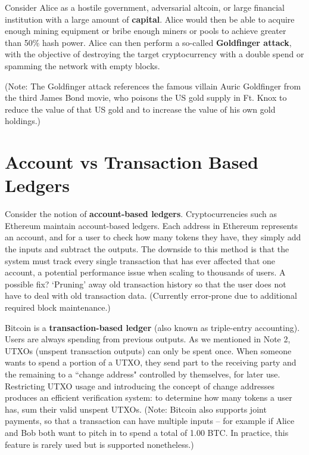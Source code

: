 \documentclass[full.tex]{subfiles}
\begin{document}
    Consider Alice as a hostile government, adversarial altcoin, or large financial institution with a large amount of \textbf{capital}. Alice would then be able to acquire enough mining equipment or bribe enough miners or pools to achieve greater than 50\% hash power. Alice can then perform a so-called \textbf{Goldfinger attack}, with the objective of destroying the target cryptocurrency with a double spend or spamming the network with empty blocks.
    
    (Note: The Goldfinger attack references the famous villain Auric Goldfinger from the third James Bond movie, who poisons the US gold supply in Ft. Knox to reduce the value of that US gold and to increase the value of his own gold holdings.)
    
    \section*{Account vs Transaction Based Ledgers}
    
    Consider the notion of \textbf{account-based ledgers}. Cryptocurrencies such as Ethereum maintain account-based ledgers. Each address in Ethereum represents an account, and for a user to check how many tokens they have, they simply add the inputs and subtract the outputs. The downside to this method is that the system must track every single transaction that has ever affected that one account, a potential performance issue when scaling to thousands of users. A possible fix? `Pruning' away old transaction history so that the user does not have to deal with old transaction data. (Currently error-prone due to additional required block maintenance.)
    
    Bitcoin is a \textbf{transaction-based ledger} (also known as triple-entry accounting). Users are always spending from previous outputs. As we mentioned in Note 2, UTXOs (unspent transaction outputs) can only be spent once. When someone wants to spend a portion of a UTXO, they send part to the receiving party and the remaining to a ``change address" controlled by themselves, for later use. Restricting UTXO usage and introducing the concept of change addresses produces an efficient verification system: to determine how many tokens a user has, sum their valid unspent UTXOs. (Note: Bitcoin also supports joint payments, so that a transaction can have multiple inputs -- for example if Alice and Bob both want to pitch in to spend a total of 1.00 BTC. In practice, this feature is rarely used but is supported nonetheless.)
    
\end{document}
